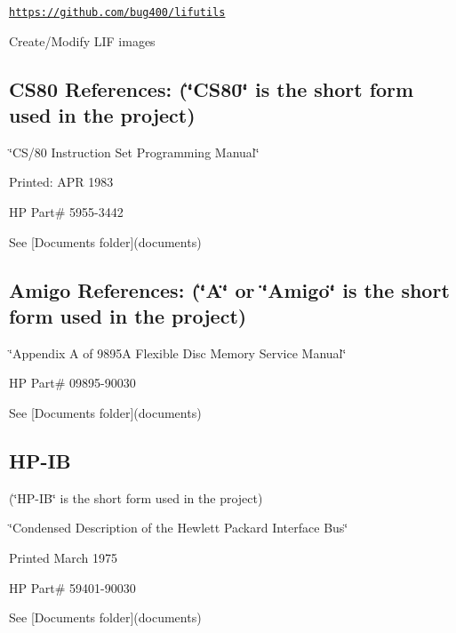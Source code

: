 \begin{DoxyItemize}
\item \href{https://github.com/bug400/lifutils}{\tt https\+://github.\+com/bug400/lifutils}
\item Create/\+Modify L\+IF images
\end{DoxyItemize}



 \subsection*{C\+S80 References\+: (\char`\"{}\+C\+S80\char`\"{} is the short form used in the project)}


\begin{DoxyItemize}
\item \char`\"{}\+C\+S/80 Instruction Set Programming Manual\char`\"{}
\item Printed\+: A\+PR 1983
\item HP Part\# 5955-\/3442
\item See \mbox{[}Documents folder\mbox{]}(documents)
\end{DoxyItemize}



 \subsection*{Amigo References\+: (\char`\"{}\+A\char`\"{} or \char`\"{}\+Amigo\char`\"{} is the short form used in the project)}


\begin{DoxyItemize}
\item \char`\"{}\+Appendix A of 9895\+A Flexible Disc Memory Service Manual\char`\"{}
\item HP Part\# 09895-\/90030
\item See \mbox{[}Documents folder\mbox{]}(documents)
\end{DoxyItemize}



 \subsection*{H\+P-\/\+IB}


\begin{DoxyItemize}
\item (\char`\"{}\+H\+P-\/\+I\+B\char`\"{} is the short form used in the project)
\item \char`\"{}\+Condensed Description of the Hewlett Packard Interface Bus\char`\"{}
\item Printed March 1975
\item HP Part\# 59401-\/90030
\item See \mbox{[}Documents folder\mbox{]}(documents)
\end{DoxyItemize}



